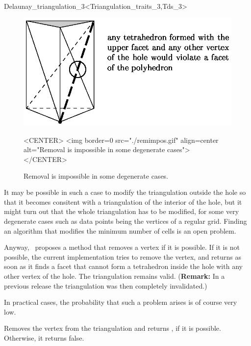 \begin{ccRefClass}{Delaunay_triangulation_3<Triangulation_traits_3,Tds_3>}
\begin{figure}[htbp]
\begin{ccTexOnly}
\begin{center} 
\includegraphics{remimpos.eps} 
\end{center}
\end{ccTexOnly}
\caption{Removal is impossible in some degenerate cases.
\label{Triangulation3-fig-remimpos}}
\begin{ccHtmlOnly}
<CENTER>
<img border=0 src="./remimpos.gif" align=center alt="Removal is impossible in some degenerate cases">
</CENTER>
\end{ccHtmlOnly}
\end{figure} 

It may be possible in such a case to modify the triangulation outside
the hole so that it becomes consitent with a triangulation of the
interior of the hole, but it might turn out that the whole
triangulation has to be modified, for some very degenerate cases such
as data points being the vertices of a regular grid. Finding an
algorithm that modifies the minimum number of cells is an open problem.

Anyway, \cgal\ proposes a method that removes a vertex if it is
possible. If it is not possible, the current implementation tries to
remove the vertex, and returns  as soon as it finds a facet
that cannot form a tetrahedron inside the hole with any other vertex
of the hole. The triangulation remains valid. ({\bf Remark:} In a previous 
release the triangulation was then completely invalidated.) 

In practical cases, the probability that such a problem arises is
of course very low.

{Removes the vertex  from the triangulation and returns
, if it is possible. Otherwise, it returns false.
}


\end{ccRefClass}
